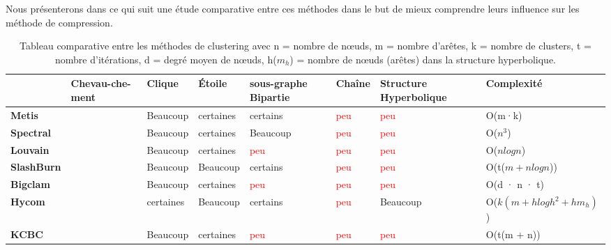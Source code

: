 			 Nous présenterons dans ce qui suit une étude comparative entre ces méthodes dans le but de mieux comprendre leurs influence sur les méthode de compression.
			 \begin{table}[h]
							\footnotesize
							\begin{tabular}{|R{2cm}||C{1cm}|C{1.5cm}|C{1.5cm}|C{1.5cm}|C{1.5cm}|C{1.5cm}|C{2.5cm}|}
								\hline & Chevau-che-ment & Clique & Étoile & sous-graphe Bipartie & Chaîne & Structure Hyperbolique & Complexité \\
								\hline \textbf{Metis} & \textcolor{red}{\xmark} & \textcolor{PineGreen}{Beaucoup} & \textcolor{BurntOrange}{certaines} & \textcolor{BurntOrange}{certains} & \textcolor{red}{peu}  & \textcolor{red}{peu}  & O(m·k)\\
								\hline	\textbf{Spectral} & \textcolor{red}{\xmark} & \textcolor{PineGreen}{Beaucoup} & \textcolor{BurntOrange}{certaines} & \textcolor{PineGreen}{Beaucoup} & \textcolor{red}{peu}  & \textcolor{red}{peu}  & O($n^3$)\\
								\hline \textbf{Louvain} & \textcolor{red}{\xmark} & \textcolor{PineGreen}{Beaucoup} & \textcolor{BurntOrange}{certaines} & \textcolor{red}{peu}  & \textcolor{red}{peu}  & \textcolor{red}{peu} & O($n log n$)\\
								\hline \textbf{SlashBurn} & \textcolor{PineGreen}{\checkmark} & \textcolor{PineGreen}{Beaucoup} & \textcolor{PineGreen}{Beaucoup} & \textcolor{BurntOrange}{certains} & \textcolor{red}{peu} & \textcolor{red}{peu} & O(t($m+nlogn$)) \\
								\hline \textbf{Bigclam} & \textcolor{PineGreen}{\checkmark}  & \textcolor{PineGreen}{Beaucoup} & \textcolor{BurntOrange}{certaines} & \textcolor{red}{peu}  & \textcolor{red}{peu}  & \textcolor{red}{peu}  & O(d · n · t)\\					
								\hline \textbf{Hycom} & \textcolor{PineGreen}{\checkmark}  & \textcolor{BurntOrange}{certaines} & \textcolor{PineGreen}{Beaucoup} & \textcolor{BurntOrange}{certains} & \textcolor{red}{peu}  & \textcolor{PineGreen}{Beaucoup}  & O($k(m + h log h^2 +hm_{h} )$)\\
								
								
								
								\hline \textbf{KCBC} & \textcolor{PineGreen}{\checkmark} & \textcolor{PineGreen}{Beaucoup} & \textcolor{BurntOrange}{certaines} & \textcolor{red}{peu}  & \textcolor{red}{peu}  & \textcolor{red}{peu}  & O(t(m + n))\\
								
								\hline 
							\end{tabular} \\
								\caption{Tableau comparative entre les méthodes de clustering avec n = nombre de nœuds, m = nombre d'arêtes, k = nombre de clusters, t = nombre d'itérations, d = degré moyen de nœuds, h($m_{h}$) = nombre de nœuds (arêtes) dans la structure hyperbolique.}
    								\label{tab:clusteringMethode} 
							\end{table}
							\normalsize	
			 